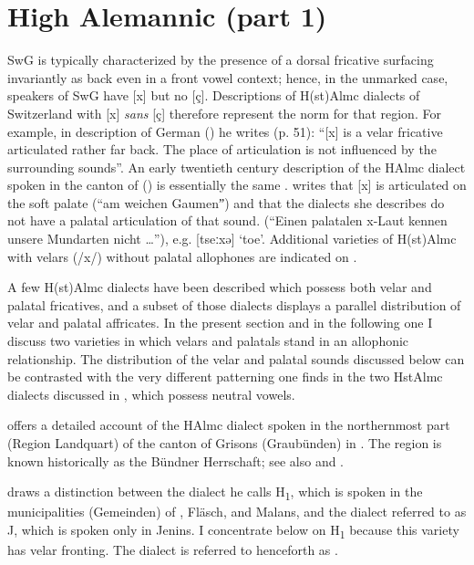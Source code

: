 \section{{High} {Alemannic} {(part} {1)}}\label{sec:3.3}

SwG is typically characterized by the presence of a dorsal fricative surfacing invariantly as back even in a front vowel context; hence, in the unmarked case, speakers of SwG have [x] but no [ç]. Descriptions of H(st)Almc dialects of Switzerland with [x] \textit{sans} [ç] therefore represent the norm for that region. For example, in  description of  German () he writes (p. 51): “[x] is a velar fricative articulated rather far back. The place of articulation is not influenced by the surrounding sounds”. An early twentieth century description of the HAlmc dialect spoken in the canton of  () is essentially the same \citep{Streiff1915}. \citet[12]{Streiff1915} writes that [x] is articulated on the soft palate (“am weichen Gaumenˮ) and that the dialects she describes do not have a palatal articulation of that sound. (“Einen palatalen x-Laut kennen unsere Mundarten nicht …”), e.g. [tseːxə] ‘toe’. Additional varieties of H(st)Almc with velars (/x/) without palatal allophones are indicated on .

A few H(st)Almc dialects have been described which possess both velar and palatal fricatives, and a subset of those dialects displays a parallel distribution of velar and palatal affricates. In the present section and in the following one I discuss two varieties in which velars and palatals stand in an allophonic relationship. The distribution of the velar and palatal sounds discussed below can be contrasted with the very different patterning one finds in the two HstAlmc dialects discussed in , which possess neutral vowels.

\citet{Meinherz1920} offers a detailed account of the HAlmc dialect spoken in the northernmost part (Region Landquart) of the canton of Grisons (Graubünden) in . The region is known historically as the Bündner Herrschaft; see also  and .

\citet[20]{Meinherz1920} draws a distinction between the dialect he calls H\textsubscript{1}, which is spoken in the municipalities (Gemeinden) of , Fläsch, and Malans, and the dialect referred to as J, which is spoken only in Jenins. I concentrate below on H\textsubscript{1} because this variety has velar fronting. The dialect is referred to henceforth as .

